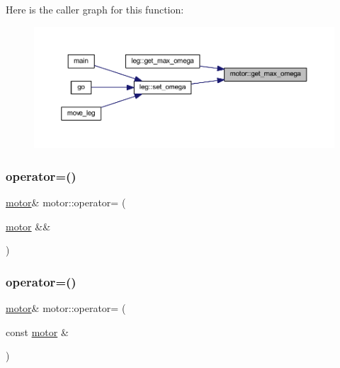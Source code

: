 Here is the caller graph for this function\+:
\nopagebreak
\begin{figure}[H]
\begin{center}
\leavevmode
\includegraphics[width=350pt]{classmotor_a9c5b147bc6f5cc68d15286e4740a1e59_icgraph}
\end{center}
\end{figure}
\mbox{\label{classmotor_a56c0ac07ae4fe630290c25415f36f828}} 
\subsubsection{\texorpdfstring{operator=()}{operator=()}\hspace{0.1cm}{\footnotesize\ttfamily [1/2]}}
{\footnotesize\ttfamily \mbox{\hyperlink{classmotor}{motor}}\& motor\+::operator= (\begin{DoxyParamCaption}\item[{\mbox{\hyperlink{classmotor}{motor}} \&\&}]{ }\end{DoxyParamCaption})\hspace{0.3cm}{\ttfamily [default]}}

\mbox{\label{classmotor_aaca163743034455779d02fd44e1c090e}} 
\subsubsection{\texorpdfstring{operator=()}{operator=()}\hspace{0.1cm}{\footnotesize\ttfamily [2/2]}}
{\footnotesize\ttfamily \mbox{\hyperlink{classmotor}{motor}}\& motor\+::operator= (\begin{DoxyParamCaption}\item[{const \mbox{\hyperlink{classmotor}{motor}} \&}]{ }\end{DoxyParamCaption})\hspace{0.3cm}{\ttfamily [default]}}


